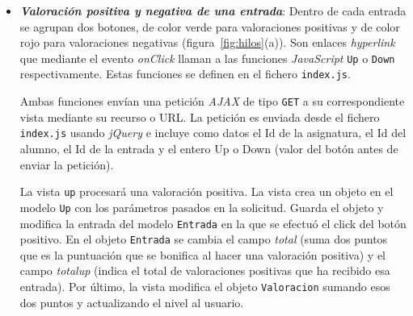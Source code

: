 \documentclass[a4paper, 12pt]{book}
\begin{document}
\begin{itemize}
  \begin{figure}
    \centering
    \caption{\textit{Comentario eliminado en una entrada.}}
    \label{fig:eliminarcomentario}
  \end{figure}
  
  \item {\bfseries \textit{Valoraci\'on positiva y negativa de una entrada}}: Dentro de cada entrada se agrupan dos botones, de color verde para 
  valoraciones positivas y de color rojo para valoraciones negativas (figura~\ref{fig:hilos}(a)). Son enlaces \textit{hyperlink} que mediante el evento \textit{onClick} llaman a las 
  funciones \textit{JavaScript} \texttt{Up} o \texttt{Down} respectivamente. Estas funciones se definen en el fichero \texttt{index.js}. 
  
  Ambas funciones env\'ian una petici\'on \textit{AJAX} de tipo \texttt{GET} a su correspondiente vista mediante su recurso o URL. La petici\'on es enviada 
  desde el fichero \texttt{index.js} usando \textit{jQuery} e incluye como datos el Id de la asignatura, el Id del alumno, el Id de la entrada y el entero 
  Up o Down (valor del bot\'on antes de enviar la petici\'on).
  
  La vista \texttt{up} procesar\'a una valoraci\'on positiva. La vista crea un objeto en el modelo \texttt{Up} con los par\'ametros pasados en la solicitud. 
  Guarda el objeto y modifica la entrada del modelo \texttt{Entrada} en la que se efectu\'o el click del bot\'on positivo. En el objeto \texttt{Entrada} se
  cambia el campo \textit{total} (suma dos puntos que es la puntuaci\'on que se bonifica al hacer una valoraci\'on positiva) y el campo \textit{totalup} 
  (indica el total de valoraciones positivas que ha recibido esa entrada). Por \'ultimo, la vista modifica el objeto \texttt{Valoracion} sumando esos dos 
  puntos y actualizando el nivel al usuario.
  

\end{itemize}
\end{document}
